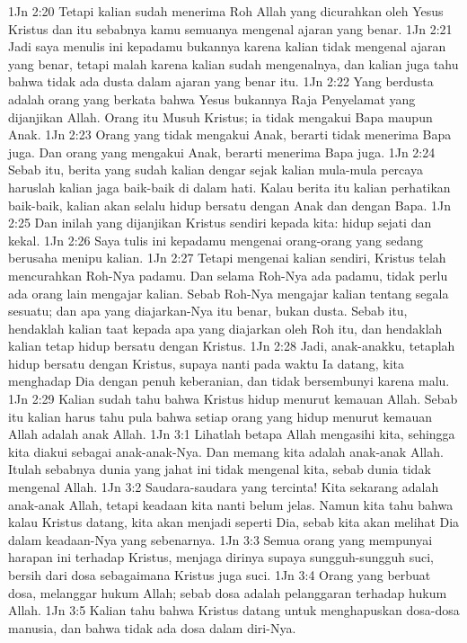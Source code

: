 1Jn 2:20  Tetapi kalian sudah menerima Roh Allah yang dicurahkan oleh Yesus Kristus dan itu sebabnya kamu semuanya mengenal ajaran yang benar.
1Jn 2:21  Jadi saya menulis ini kepadamu bukannya karena kalian tidak mengenal ajaran yang benar, tetapi malah karena kalian sudah mengenalnya, dan kalian juga tahu bahwa tidak ada dusta dalam ajaran yang benar itu.
1Jn 2:22  Yang berdusta adalah orang yang berkata bahwa Yesus bukannya Raja Penyelamat yang dijanjikan Allah. Orang itu Musuh Kristus; ia tidak mengakui Bapa maupun Anak.
1Jn 2:23  Orang yang tidak mengakui Anak, berarti tidak menerima Bapa juga. Dan orang yang mengakui Anak, berarti menerima Bapa juga.
1Jn 2:24  Sebab itu, berita yang sudah kalian dengar sejak kalian mula-mula percaya haruslah kalian jaga baik-baik di dalam hati. Kalau berita itu kalian perhatikan baik-baik, kalian akan selalu hidup bersatu dengan Anak dan dengan Bapa.
1Jn 2:25  Dan inilah yang dijanjikan Kristus sendiri kepada kita: hidup sejati dan kekal.
1Jn 2:26  Saya tulis ini kepadamu mengenai orang-orang yang sedang berusaha menipu kalian.
1Jn 2:27  Tetapi mengenai kalian sendiri, Kristus telah mencurahkan Roh-Nya padamu. Dan selama Roh-Nya ada padamu, tidak perlu ada orang lain mengajar kalian. Sebab Roh-Nya mengajar kalian tentang segala sesuatu; dan apa yang diajarkan-Nya itu benar, bukan dusta. Sebab itu, hendaklah kalian taat kepada apa yang diajarkan oleh Roh itu, dan hendaklah kalian tetap hidup bersatu dengan Kristus.
1Jn 2:28  Jadi, anak-anakku, tetaplah hidup bersatu dengan Kristus, supaya nanti pada waktu Ia datang, kita menghadap Dia dengan penuh keberanian, dan tidak bersembunyi karena malu.
1Jn 2:29  Kalian sudah tahu bahwa Kristus hidup menurut kemauan Allah. Sebab itu kalian harus tahu pula bahwa setiap orang yang hidup menurut kemauan Allah adalah anak Allah.
1Jn 3:1  Lihatlah betapa Allah mengasihi kita, sehingga kita diakui sebagai anak-anak-Nya. Dan memang kita adalah anak-anak Allah. Itulah sebabnya dunia yang jahat ini tidak mengenal kita, sebab dunia tidak mengenal Allah.
1Jn 3:2  Saudara-saudara yang tercinta! Kita sekarang adalah anak-anak Allah, tetapi keadaan kita nanti belum jelas. Namun kita tahu bahwa kalau Kristus datang, kita akan menjadi seperti Dia, sebab kita akan melihat Dia dalam keadaan-Nya yang sebenarnya.
1Jn 3:3  Semua orang yang mempunyai harapan ini terhadap Kristus, menjaga dirinya supaya sungguh-sungguh suci, bersih dari dosa sebagaimana Kristus juga suci.
1Jn 3:4  Orang yang berbuat dosa, melanggar hukum Allah; sebab dosa adalah pelanggaran terhadap hukum Allah.
1Jn 3:5  Kalian tahu bahwa Kristus datang untuk menghapuskan dosa-dosa manusia, dan bahwa tidak ada dosa dalam diri-Nya.
